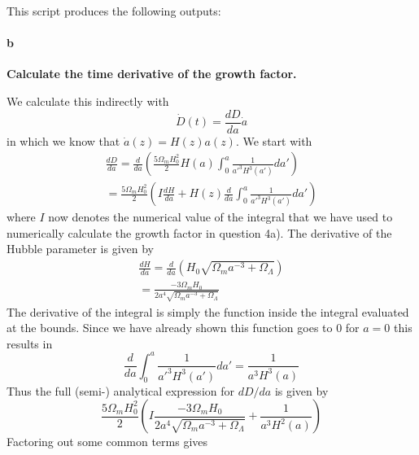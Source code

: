 

This script produces the following outputs:




\paragraph{b} \textbf{Calculate the time derivative of the growth factor.}

We calculate this indirectly with
\begin{equation}
\dot{D}(t) = \frac{dD}{da} \dot{a}
\end{equation}
in which we know that $\dot{a}(z) = H(z)a(z)$. 
We start with 
\begin{equation}
\begin{split}
\frac{dD}{da} = \frac{d}{da} \left( \frac{5\Omega_m H_0^2}{2} H(a) \int_0^{a} \frac{1}{a'^{3} H^3(a')} da' \right) \\ 
= \frac{5\Omega_m H_0^2}{2} \left(I \frac{dH}{da} + H(z) \frac{d}{da} \int_0^{a} \frac{1}{a'^{3} H^3(a')} da' \right)
\end{split}
\end{equation}
where $I$ now denotes the numerical value of the integral that we have used to numerically calculate the growth factor in question 4a). The derivative of the Hubble parameter is given by
\begin{equation}
\begin{split}
\frac{dH}{da} = \frac{d}{da} \left(H_0 \sqrt{\Omega_m a^{-3} + \Omega_\Lambda} \right) \\
=  \frac{-3\Omega_mH_0}{2a^4\sqrt{\Omega_m a^{-3}+\Omega_\Lambda}}
\end{split}
\end{equation}
The derivative of the integral is simply the function inside the integral evaluated at the bounds. Since we have already shown this function goes to 0 for $a=0$ this results in
\begin{equation}
\frac{d}{da} \int_0^{a} \frac{1}{a'^{3} H^3(a')} da' = \frac{1}{a^{3} H^3(a)}
\end{equation}
Thus the full (semi-) analytical expression for $dD/da$ is given by
\begin{equation}
\frac{5\Omega_m H_0^2}{2} \left(I \frac{-3\Omega_mH_0}{2a^4\sqrt{\Omega_m a^{-3}+\Omega_\Lambda}} + \frac{1}{a^{3} H^2(a)} \right)
\end{equation}
Factoring out some common terms gives
